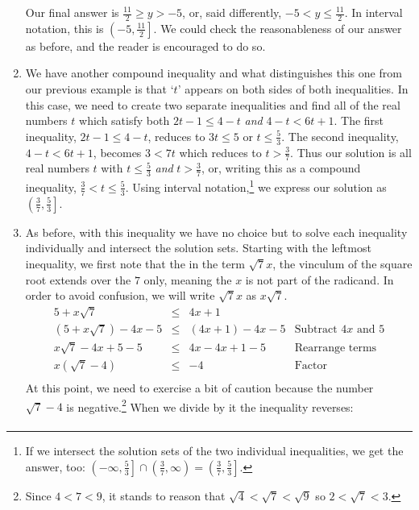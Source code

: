 \begin{ex}
\begin{enumerate}
Our final answer is $\frac{11}{2} \geq y > -5$, or, said differently,  $-5 < y \leq \frac{11}{2}$. In interval notation, this is $\left( -5, \frac{11}{2} \right]$.  We could check the reasonableness of our answer as before, and the reader is encouraged to do so.  

\item  We have another compound inequality and what distinguishes this one from our previous example is that `$t$' appears on both sides of both inequalities.  In this case, we need to create two separate inequalities and find all of the real numbers $t$ which satisfy both  $2t-1 \leq 4-t$ \textit{and} $4-t < 6t + 1$.  The first inequality, $2t-1 \leq 4-t$, reduces to $3t \leq 5$ or $t \leq \frac{5}{3}$.  The second inequality, $4-t < 6t+1$, becomes $3 < 7t$  which reduces to $t > \frac{3}{7}$.  Thus our solution is all real numbers $t$ with $t \leq \frac{5}{3}$ \textit{and}  $t > \frac{3}{7}$, or, writing this as a compound inequality,  $\frac{3}{7} < t \leq \frac{5}{3}$. Using interval notation,\footnote{If we intersect the solution sets of the two individual inequalities, we get the answer, too:  $\left(-\infty, \frac{5}{3}\right] \cap \left(\frac{3}{7}, \infty\right) = \left( \frac{3}{7}, \frac{5}{3} \right]$.} we express our solution as $\left( \frac{3}{7}, \frac{5}{3} \right]$.


\item As before, with this inequality  we have no choice but to solve each inequality individually and intersect the solution sets.  Starting with the leftmost inequality, we first note that the in the term $\sqrt{7} x$, the vinculum of the square root extends over the $7$ only, meaning the $x$ is not part of the radicand.  In order to avoid confusion, we will write $\sqrt{7} x$ as $x \sqrt{7}$.\[ \begin{array}{rclr}

5 + x\sqrt{7}  & \leq & 4x+1  & \\

(5 + x\sqrt{7} ) -4x  - 5 & \leq&  (4x + 1) - 4x - 5  & \text{Subtract $4x$ and $5$} \\

x\sqrt{7} - 4x + 5 - 5 & \leq & 4x - 4x + 1 - 5 & \text{Rearrange terms} \\

x(\sqrt{7} - 4) & \leq & -4 & \text{Factor} \\ \end{array} \] At this point, we need to exercise a bit of caution because the number $\sqrt{7} - 4$ is negative.\footnote{Since $4 < 7 < 9$, it stands to reason that $\sqrt{4} < \sqrt{7} < \sqrt{9}$ so $2 < \sqrt{7} < 3$.} When we divide by it the inequality reverses:\[ \begin{array}{rclr}


\end{array}\]
\end{enumerate}
\end{ex}
